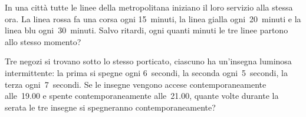 
\begin{multicols}{2}

% 

\begin{esercizio}
\label{ese:1.45}
 In una città tutte le linee della metropolitana iniziano il loro servizio alla stessa ora. La linea rossa fa una corsa ogni
15~minuti, la linea gialla ogni~20~minuti e la linea blu ogni~30~minuti. Salvo ritardi, ogni quanti minuti le tre linee
partono allo stesso momento?
\end{esercizio}

\begin{esercizio}
\label{ese:1.46}
 Tre negozi si trovano sotto lo stesso porticato, ciascuno ha un'insegna luminosa intermittente: la prima si spegne ogni
6~secondi, la seconda ogni~5~secondi, la terza ogni~7~secondi. Se le insegne vengono accese contemporaneamente
alle~19.00 e spente contemporaneamente alle~21.00, quante volte durante la serata le tre insegne
si spegneranno contemporaneamente?
\end{esercizio}


\end{multicols}
